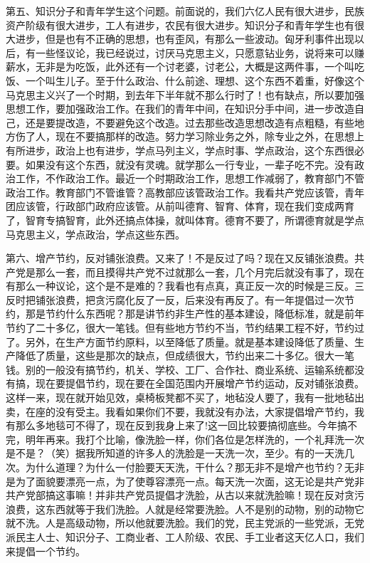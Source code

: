 第五、知识分子和青年学生这个问题。前面说的，我们六亿人民有很大进步，民族资产阶级有很大进步，工人有进步，农民有很大进步。知识分子和青年学生也有很大进步，但是也有不正确的思想，也有歪风，有那么一些波动。匈牙利事件出现以后，有一些怪议论，我已经说过，讨厌马克思主义，只愿意钻业务，说将来可以赚薪水，无非是为吃饭，此外还有一个讨老婆，讨老公，大概是这两件事，一个叫吃饭、一个叫生儿子。至于什么政治、什么前途、理想、这个东西不着重，好像这个马克思主义兴了一个时期，到去年下半年就不那么行时了！也有缺点，所以要加强思想工作，要加强政治工作。在我们的青年中间，在知识分手中间，进一步改造自己，还是要提改造，不要避免这个改造。过去那些改造思想改造有点粗糙，有些地方伤了人，现在不要搞那样的改造。努力学习除业务之外，除专业之外，在思想上有所进步，政治上也有进步，学点马列主义，学点时事、学点政治，这个东西很必要。如果没有这个东西，就没有灵魂。就学那么一行专业，一辈子吃不完。没有政治工作，不作政治工作。最近一个时期政治工作，思想工作减弱了，教育部门不管政治工作。教育部门不管谁管？高教部应该管政治工作。我看共产党应该管，青年团应该管，行政部门政府应该管。从前叫德育、智育、体育，现在我们变成两育了，智育专搞智育，此外还搞点体操，就叫体育。德育不要了，所谓德育就是学点马克思主义，学点政治，学点这些东西。

第六、增产节约，反对铺张浪费。又来了！不是反过了吗？现在又反铺张浪费。共产党是那么一套，而且摸得共产党不过就那么一套，几个月完后就没有事了，现在有那么一种议论，这个是不是难的？我看也有点真，真正反一次的时候是三反。三反时把铺张浪费，把贪污腐化反了一反，后来没有再反了。有一年提倡过一次节约，那是节约什么东西呢？那是讲节约非生产性的基本建设，降低标准，就是前年节约了二十多亿，很大一笔钱。但有些地方节约不当，节约结果工程不好，节约过了。另外，在生产方面节约原料，以至降低了质量。就是基本建设降低了质量、生产降低了质量，这些是那次的缺点，但成绩很大，节约出来二十多亿。很大一笔钱。别的一般没有搞节约，机关、学校、工厂、合作社、商业系统、运输系统都没有搞，现在要提倡节约，现在要在全国范围内开展增产节约运动，反对铺张浪费。这样一来，现在就开始见效，桌椅板凳都不买了，地毡没人要了，我有一批地毡出卖，在座的没有受主。我看如果你们不要，我就没有办法，大家提倡增产节约，我有那么多地毯可不得了，现在反到我身上来了!这一回比较要搞彻底些。今年搞不完，明年再来。我打个比喻，像洗脸一样，你们各位是怎样洗的，一个礼拜洗一次是不是？（笑）据我所知道的许多人的洗脸是一天洗一次，至少。有的一天洗几次。为什么道理？为什么一付脸要天天洗，干什么？那无非不是增产也节约？无非是为了面貌要漂亮一点，为了使尊容漂亮一点。每天洗一次面，这无论是共产党非共产党部搞这事嘛！并非共产党员提倡才洗脸，从古以来就洗脸嘛！现在反对贪污浪费，这东西就等于我们洗脸。人就是经常要洗脸。人不是别的动物，别的动物它就不洗。人是高级动物，所以他就要洗脸。我们的党，民主党派的一些党派，无党派民主人士、知识分子、工商业者、工人阶级、农民、手工业者这天亿人口，我们来提倡一个节约。

